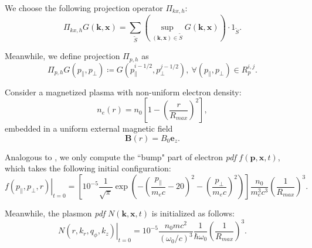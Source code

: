 \documentclass{article}
\numberwithin{equation}{section}
\begin{document}
We choose the following projection operator $\Pi_{kx,h}$:
\begin{equation*}
    \Pi_{kx,h}G(\mathbf{k},\mathbf{x})=\sum_{\widetilde{S}}\left(\sup_{(\mathbf{k},\mathbf{x})\in\widetilde{S}}G(\mathbf{k},\mathbf{x})\right)\cdot1_{\widetilde{S}}.
\end{equation*}

Meanwhile, we define projection $\Pi_{p,h}$ as 
\begin{equation*}
    \Pi_{p,h}G(p_{\parallel},p_{\perp})\coloneqq G\left(p_{\parallel}^{i-1/2},p_{\perp}^{j-1/2}\right),\ \forall(p_{\parallel},p_{\perp})\in R_{p}^{i,j}.
\end{equation*}

Consider a magnetized plasma with non-uniform electron density:
\begin{equation*}
    n_{e}(r)=n_{0}\left[1-\left(\frac{r}{R_{max}}\right)^{2}\right],
\end{equation*}
embedded in a uniform external magnetic field
\begin{equation*}
    \mathbf{B}(r)=B_{0}\mathbf{e}_{z}.
\end{equation*}

Analogous to \cite{huang2023conservative}, we only compute the ``bump" part of electron \textit{pdf} $f(\mathbf{p},\mathbf{x},t)$, which takes the following initial configuration:
\begin{equation*}
    \left.f(p_{\parallel},p_{\perp},r)\right\vert _{t=0}=\left[10^{-5}\frac{1}{\sqrt{\pi}}\exp\left(-\left(\frac{p_{\parallel}}{m_{e}c}-20\right)^{2}-\left(\frac{p_{\perp}}{m_{e}c}\right)^{2}\right)\right]\frac{n_{0}}{m_{e}^{3}c^{3}}\left(\frac{1}{R_{max}}\right)^{3}.
\end{equation*}

Meanwhile, the plasmon \textit{pdf} $N(\mathbf{k},\mathbf{x},t)$ is initialized as follows:
\begin{equation*}
    \left.N\left(r,k_{r},q_{\phi},k_{z}\right)\right\vert _{t=0}=10^{-5}\frac{n_{0}mc^{2}}{(\omega_{0}/c)^{3}}\frac{1}{\hbar\omega_{0}}\left(\frac{1}{R_{max}}\right)^{3}.
\end{equation*}



\end{document}
